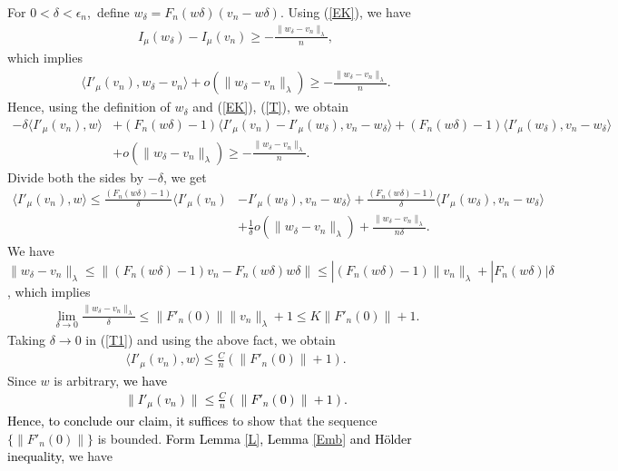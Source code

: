 \documentclass[12pt, notitlepage]{article}
\begin{document}
{For $0<\delta<\epsilon_n$,\ define $w_\delta=F_n( w\delta )(v_n-w\delta)$. Using (\ref{EK}), we have
\begin{align}
    I_\mu(w_\delta)-I_\mu(v_n)\geq -\frac{\|w_\delta-v_n\|_\lambda}{n},
\end{align}
which implies
\begin{align}\label{T}
    \langle I'_\mu(v_n), w_\delta-v_n\rangle+o(\|w_\delta-v_n\|_\lambda)\geq -\frac{\|w_\delta-v_n\|_\lambda}{n}.
\end{align}
Hence, using the definition of $w_\delta$ and (\ref{EK}), (\ref{T}), we obtain
\begin{align}
    -\delta \langle I'_\mu(v_n), w\rangle&+(F_n(w\delta)-1)\langle I'_\mu(v_n)-I'_\mu(w_\delta),v_n-w_\delta\rangle+(F_n(w\delta)-1)\langle I'_\mu(w_\delta),v_n-w_\delta\rangle \nonumber\\
    &+o(\|w_\delta-v_n\|_\lambda)\geq -\frac{\|w_\delta-v_n\|_\lambda}{n}.
\end{align}
Divide both the sides by $-\delta$, we get 
\begin{align}\label{T1}
    \langle I'_\mu(v_n), w\rangle\leq \frac{(F_n(w\delta)-1)}{\delta}\langle I'_\mu(v_n)&-I'_\mu(w_\delta),v_n-w_\delta\rangle+\frac{(F_n(w\delta)-1)}{\delta}\langle I'_\mu(w_\delta),v_n-w_\delta\rangle \nonumber\\
    &+\frac{1}{\delta}o(\|w_\delta-v_n\|_\lambda)+\frac{\|w_\delta-v_n\|_\lambda}{n\delta}.
\end{align}
 We have $\|w_\delta-v_n\|_\lambda\leq \|(F_n(w\delta)-1)v_n-F_n(w\delta)w\delta\|\leq|(F_n(w\delta)-1)\|v_n\|_\lambda+|F_n(w\delta)|\delta$, which implies
 \begin{align}
     \lim_{\delta\to 0}\frac{\|w_\delta-v_n\|_\lambda}{\delta}\leq \|F'_n(0)\|\|v_n\|_\lambda+1\leq K\|F'_n(0)\|+1.
 \end{align}
Taking $\delta\to 0$ in (\ref{T1}) and using the above fact, we obtain
\begin{align}
  \langle I'_\mu(v_n), w\rangle\leq \frac{C}{n}\left (\|F'_n(0)\|+1\right ).  
\end{align}
Since $w$ is arbitrary, \textcolor{black}{we have
\begin{align}\label{TT2}
  \|I'_\mu(v_n)\|\leq \frac{C}{n}\left (\|F'_n(0)\|+1\right ).  
\end{align} 
Hence, to conclude our claim, it suffices} to show that the sequence $\{\|F'_n(0)\|\}$ is bounded. \textcolor{black}{Form Lemma \ref{L}, Lemma \ref{Emb} and H\"{o}lder inequality,} we have
\begin{align}

\end{align}}
\end{document}
